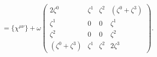 \begin{equation}
 = \{\chi^{\mu\nu}\} +\omega\left(
\begin{array}{cccc}
2 \zeta^0   & \zeta^1 & \zeta^2  & (\zeta^0 + \zeta^3) \\
\zeta^1 &0 & 0 & \zeta^1 \\
\zeta^2  & 0 & 0 & \zeta^2 \\
(\zeta^0 + \zeta^3) &\zeta^1 &\zeta^2 & 2 \zeta^3
\end{array}\right).
\label{577}
\end{equation}

